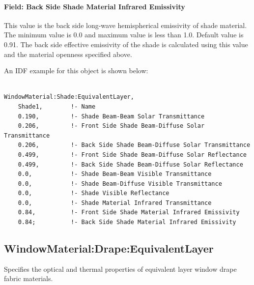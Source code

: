 \paragraph{Field: Back Side Shade Material Infrared Emissivity}\label{field-back-side-shade-material-infrared-emissivity}

This value is the back side long-wave hemispherical emissivity of shade material. The minimum value is 0.0 and maximum value is less than 1.0. Default value is 0.91. The back side effective emissivity of the shade is calculated using this value and the material openness specified above.

An IDF example for this object is shown below:

\begin{lstlisting}

WindowMaterial:Shade:EquivalentLayer,
    Shade1,        !- Name
    0.190,         !- Shade Beam-Beam Solar Transmittance
    0.206,         !- Front Side Shade Beam-Diffuse Solar Transmittance
    0.206,         !- Back Side Shade Beam-Diffuse Solar Transmittance
    0.499,         !- Front Side Shade Beam-Diffuse Solar Reflectance
    0.499,         !- Back Side Shade Beam-Diffuse Solar Reflectance
    0.0,           !- Shade Beam-Beam Visible Transmittance
    0.0,           !- Shade Beam-Diffuse Visible Transmittance
    0.0,           !- Shade Visible Reflectance
    0.0,           !- Shade Material Infrared Transmittance
    0.84,          !- Front Side Shade Material Infrared Emissivity
    0.84;          !- Back Side Shade Material Infrared Emissivity
\end{lstlisting}

\subsection{WindowMaterial:Drape:EquivalentLayer}\label{windowmaterialdrapeequivalentlayer}

Specifies the optical and thermal properties of equivalent layer window drape fabric materials.

